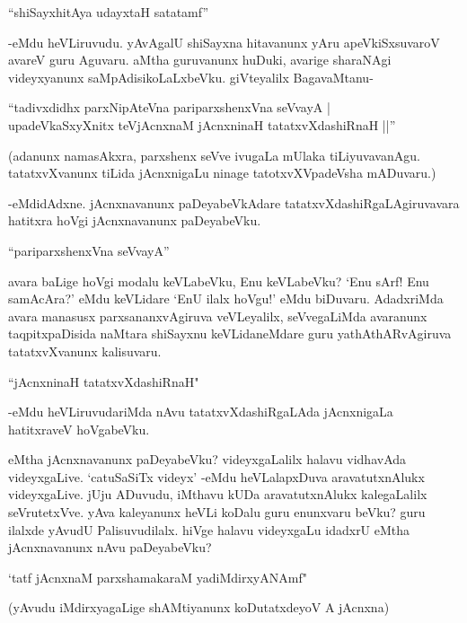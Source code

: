 \begin{shloka} 
``shiSayxhitAya udayxtaH satatamf'' 
\end{shloka}

-eMdu heVLiruvudu. yAvAgalU shiSayxna hitavanunx yAru apeVkiSxsuvaroV avareV guru Aguvaru. aMtha guruvanunx huDuki, avarige sharaNAgi videyxyanunx saMpAdisikoLaLxbeVku. giVteyalilx BagavaMtanu-

\begin{shloka}
``tadivxdidhx parxNipAteVna pariparxshenxVna seVvayA |\\
upadeVkaSxyXnitx teVjAcnxnaM jAcnxninaH tatatxvXdashiRnaH ||''
\end{shloka}

(adanunx namasAkxra, parxshenx seVve ivugaLa mUlaka tiLiyuvavanAgu. tatatxvXvanunx tiLida jAcnxnigaLu ninage tatotxvXVpadeVsha mADuvaru.)

-eMdidAdxne. jAcnxnavanunx paDeyabeVkAdare tatatxvXdashiRgaLAgiruvavara hatitxra hoVgi jAcnxnavanunx paDeyabeVku.

\begin{shloka}
``pariparxshenxVna seVvayA''
\end{shloka}

avara baLige hoVgi modalu keVLabeVku, Enu keVLabeVku? `Enu sArf! Enu samAcAra?' eMdu keVLidare `EnU ilalx hoVgu!' eMdu biDuvaru. AdadxriMda avara manasusx parxsananxvAgiruva veVLeyalilx, seVvegaLiMda avaranunx taqpitxpaDisida naMtara shiSayxnu keVLidaneMdare guru yathAthARvAgiruva tatatxvXvanunx kalisuvaru. 

\begin{shloka}
``jAcnxninaH tatatxvXdashiRnaH"
\end{shloka}

-eMdu heVLiruvudariMda nAvu tatatxvXdashiRgaLAda jAcnxnigaLa hatitxraveV hoVgabeVku.

eMtha jAcnxnavanunx paDeyabeVku? videyxgaLalilx halavu vidhavAda videyxgaLive. `catuSaSiTx videyx' -eMdu heVLalapxDuva aravatutxnAlukx videyxgaLive. jUju ADuvudu, iMthavu kUDa aravatutxnAlukx kalegaLalilx seVrutetxVve. yAva kaleyanunx heVLi koDalu guru enunxvaru beVku? guru ilalxde yAvudU Palisuvudilalx. hiVge halavu videyxgaLu idadxrU eMtha jAcnxnavanunx nAvu paDeyabeVku? 

\begin{shloka}
`tatf jAcnxnaM parxshamakaraM yadiMdirxyANAmf" 
\end{shloka}

(yAvudu iMdirxyagaLige shAMtiyanunx koDutatxdeyoV A jAcnxna)

